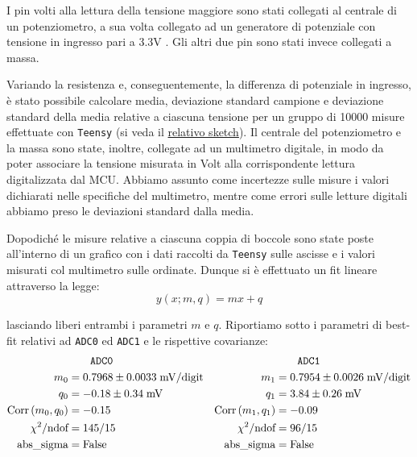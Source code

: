 \documentclass{article}[a4paper, oneside, 11pt]
\begin{document}
I pin volti alla lettura della tensione maggiore sono stati collegati al 
centrale di un potenziometro, a sua volta collegato ad un generatore di 
potenziale con tensione in ingresso pari a 3.3V . Gli altri due pin sono stati 
invece collegati a massa.

Variando la resistenza e, conseguentemente, la differenza di potenziale in 
ingresso, è stato possibile calcolare media, deviazione standard campione
e deviazione standard della media relative a ciascuna tensione per 
un gruppo di 10000 misure effettuate con \verb+Teensy+ (si veda il 
\href{https://github.com/LucaCiucci/relaz_seme/blob/master/sketches/teensy_calib/teensy_calib.ino}{relativo sketch}).
Il centrale del potenziometro e la massa sono state, inoltre, collegate ad un
multimetro digitale, in modo da poter associare la tensione misurata in
Volt alla corrispondente lettura digitalizzata dal MCU. Abbiamo assunto come
incertezze sulle misure i valori dichiarati nelle specifiche del multimetro,
mentre come errori sulle letture digitali abbiamo preso le deviazioni standard
dalla media.

Dopodiché le misure relative a ciascuna coppia di boccole sono state poste 
all’interno di un grafico con i dati raccolti da \verb+Teensy+ sulle ascisse
e i valori misurati col multimetro sulle ordinate. Dunque si è effettuato un
fit lineare attraverso la legge:
\begin{equation}
y(x; m, q)  = m x + q
\end{equation}

lasciando liberi entrambi i parametri $m$ e $q$. Riportiamo sotto i parametri
di best-fit relativi ad \verb+ADC0+ ed \verb+ADC1+ e le rispettive covarianze:
\begin{align*}
	&\qquad \texttt{ADC0}	&&\qquad  \texttt{ADC1} \\
	m_0 &= 0.7968 \pm  0.0033  \; \mathrm{mV/digit} 
	& m_1  &= 0.7954 \pm 0.0026  \; \mathrm{mV/digit} \\
	q_0 &= - 0.18 \pm 0.34  \; \mathrm{mV} 	
	&q_1 &= 3.84  \pm 0.26  \; \mathrm{mV} \\
	\text{Corr}\left(m_0, q_0\right) &= - 0.15      &\text{Corr}\left(m_1, q_1\right) &= - 0.09 \\
	\chi^2/\text{ndof} &= 145/15	&\chi^2/\text{ndof} &= 96/15 \\ 
	\text{abs\_sigma} &= \rm False	&\text{abs\_sigma} &= \rm False
\end{align*}
\end{document}
